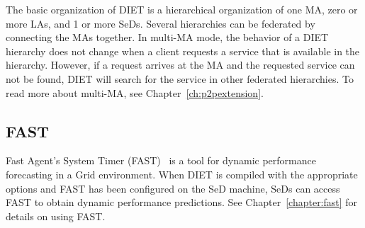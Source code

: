 The basic organization of DIET is a hierarchical organization of one
MA, zero or more LAs, and 1 or more SeDs. Several hierarchies can be
federated by connecting the MAs together. In multi-MA mode, the
behavior of a DIET hierarchy does not change when a client requests
a service that is available in the hierarchy.  However, if a request
arrives at the MA and the requested service can not be found, DIET
will search for the service in other federated hierarchies.  
To read more about multi-MA, see Chapter~\ref{ch:p2pextension}. 

\subsection{FAST}
\label{sub:fast}

Fast Agent's System Timer (FAST)~\cite{Qui02} is a tool for dynamic
performance forecasting in a Grid environment.  When DIET is
compiled with the appropriate options and FAST has been configured
on the SeD machine, SeDs can access FAST to obtain dynamic
performance predictions.  See Chapter~\ref{chapter:fast} for details
on using FAST.


